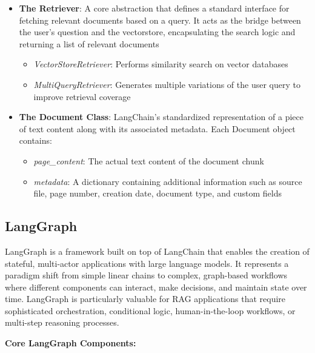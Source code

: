 \documentclass[11pt,a4paper]{report}
\begin{document}
\begin{itemize}
    \item \textbf{The Retriever}: A core abstraction that defines a standard interface for fetching relevant documents based on a query. It acts as the bridge between the user's question and the vectorstore, encapsulating the search logic and returning a list of relevant documents
    \begin{itemize}
        \item \textit{VectorStoreRetriever}: Performs similarity search on vector databases
        \item \textit{MultiQueryRetriever}: Generates multiple variations of the user query to improve retrieval coverage
    \end{itemize}
    
    \item \textbf{The Document Class}: LangChain's standardized representation of a piece of text content along with its associated metadata. Each Document object contains:
    \begin{itemize}
        \item \textit{page\_content}: The actual text content of the document chunk
        \item \textit{metadata}: A dictionary containing additional information such as source file, page number, creation date, document type, and custom fields
    \end{itemize}
\end{itemize}

\subsection{LangGraph}
LangGraph is a framework built on top of LangChain that enables the creation of stateful, multi-actor applications with large language models. It represents a paradigm shift from simple linear chains to complex, graph-based workflows where different components can interact, make decisions, and maintain state over time. LangGraph is particularly valuable for RAG applications that require sophisticated orchestration, conditional logic, human-in-the-loop workflows, or multi-step reasoning processes.

\textbf{Core LangGraph Components:}
\end{document}
